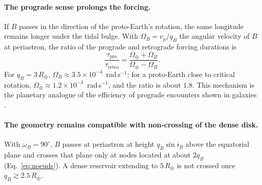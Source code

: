 \documentclass[11pt,a4paper,openany]{report}
\newcommand{\Rt}{R_{\oplus}}
\begin{document}
\paragraph{The prograde sense prolongs the forcing.}
If $B$ passes in the direction of the proto-Earth's rotation, the same longitude remains longer
under the tidal bulge. With $\Omega_B=v_p/q_B$ the angular velocity of $B$ at periastron, the ratio
of the prograde and retrograde forcing durations is
\begin{equation}
\frac{\tau_{\mathrm{pro}}}{\tau_{\text{retro}}}=\frac{\Omega_\oplus+\Omega_B}{\Omega_\oplus-\Omega_B}.
\label{eq:prograde}
\end{equation}
For $q_B=3\,\Rt$, $\Omega_B\approx3.5\times10^{-4}$~rad\,s$^{-1}$; for a proto-Earth close to
critical rotation, $\Omega_\oplus\approx1.2\times10^{-3}$~rad\,s$^{-1}$, and the ratio is about
$1.8$. This mechanism is the planetary analogue of the efficiency of prograde encounters shown in
galaxies \cite{ToomreToomre1972}.

\paragraph{The geometry remains compatible with non-crossing of the dense disk.}
With $\omega_B=90^\circ$, $B$ passes at periastron at height $q_B\sin i_B$ above the equatorial
plane and crosses that plane only at nodes located at about $2q_B$ (Eq.~\eqref{eq:noeuds}). A dense
reservoir extending to $5\,\Rt$ is not crossed once $q_B\gtrsim2.5\,\Rt$.
\end{document}
